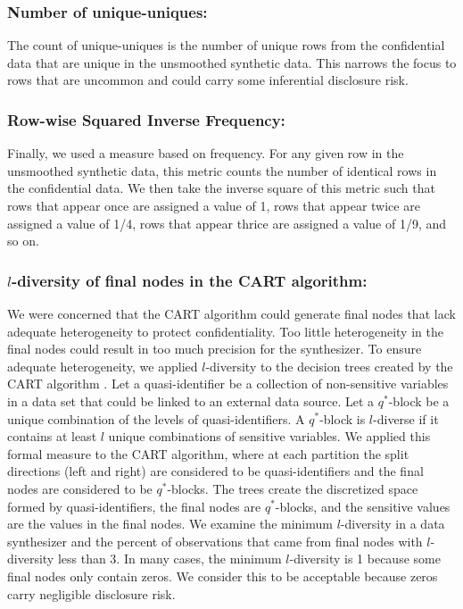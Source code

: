 \documentclass[11pt,runningheads,oribibl]{llncs}
\begin{document}
\subsubsection{Number of unique-uniques:} The count of unique-uniques is the number of unique rows from the confidential data that are unique in the unsmoothed synthetic data. This narrows the focus to rows that are uncommon and could carry some inferential disclosure risk.  

\subsubsection{Row-wise Squared Inverse Frequency:} Finally, we used a measure based on frequency. For any given row in the unsmoothed synthetic data, this metric counts the number of identical rows in the confidential data. We then take the inverse square of this metric such that rows that appear once are assigned a value of 1, rows that appear twice are assigned a value of 1/4, rows that appear thrice are assigned a value of 1/9, and so on. 

\subsubsection{$l$-diversity of final nodes in the CART algorithm:} We were concerned that the CART algorithm could generate final nodes that lack adequate heterogeneity to protect confidentiality. Too little heterogeneity in the final nodes could result in too much precision for the synthesizer. To ensure adequate heterogeneity, we applied $l$-diversity to the decision trees created by the CART algorithm \citep{machanavajjhala2007diversity}. Let a quasi-identifier be a collection of non-sensitive variables in a data set that could be linked to an external data source. Let a $q^*$-block be a unique combination of the levels of quasi-identifiers. A $q^*$-block is $l$-diverse if it contains at least $l$ unique combinations of sensitive variables. We applied this formal measure to the CART algorithm, where at each partition the split directions (left and right) are considered to be quasi-identifiers and the final nodes are considered to be $q^*$-blocks. The trees create the discretized space formed by quasi-identifiers, the final nodes are $q^*$-blocks, and the sensitive values are the values in the final nodes. We examine the minimum $l$-diversity in a data synthesizer and the percent of observations that came from final nodes with $l$-diversity less than 3. In many cases, the minimum $l$-diversity is 1 because some final nodes only contain zeros. We consider this to be acceptable because zeros carry negligible disclosure risk.
\end{document}
